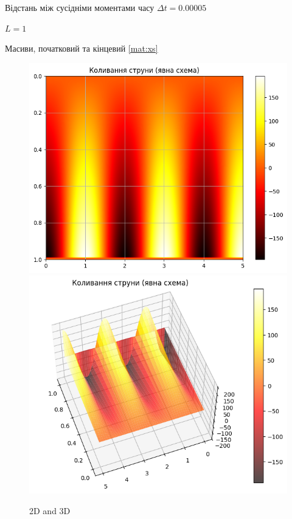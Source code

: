 \documentclass{article}
\begin{document}
        Відстань між сусідніми моментами часу $ \Delta{t} = 0.00005 $

        $ L = 1 $





        Масиви, початковий та кінцевий \eqref{mat:xs}

        \begin{figure}[h!]
            \includegraphics[width=0.5\linewidth]{straight_2d.png}
            \includegraphics[width=0.5\linewidth]{straight_3d.png}
            \label{fig:2d_3d}
            \caption{2D and 3D}
        \end{figure}
\end{document}
